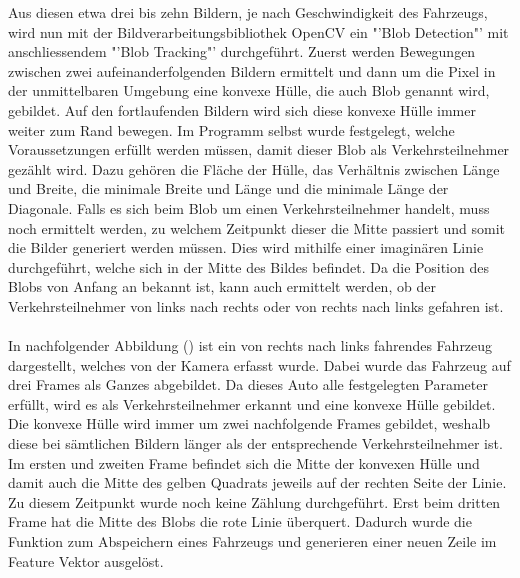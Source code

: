 Aus diesen etwa drei bis zehn Bildern, je nach Geschwindigkeit des Fahrzeugs, wird nun mit der Bildverarbeitungsbibliothek OpenCV ein "'Blob Detection"' mit anschliessendem "'Blob Tracking"' durchgeführt. Zuerst werden Bewegungen zwischen zwei aufeinanderfolgenden Bildern ermittelt und dann um die Pixel in der unmittelbaren Umgebung eine konvexe Hülle, die auch Blob genannt wird, gebildet. Auf den fortlaufenden Bildern wird sich diese konvexe Hülle immer weiter zum Rand bewegen. Im Programm selbst wurde festgelegt, welche Voraussetzungen erfüllt werden müssen, damit dieser Blob als Verkehrsteilnehmer gezählt wird. Dazu gehören die Fläche der Hülle, das Verhältnis zwischen Länge und Breite, die minimale Breite und Länge und die minimale Länge der Diagonale. Falls es sich beim Blob um einen Verkehrsteilnehmer handelt, muss noch ermittelt werden, zu welchem Zeitpunkt dieser die Mitte passiert und somit die Bilder generiert werden müssen. Dies wird mithilfe einer imaginären Linie durchgeführt, welche sich in der Mitte des Bildes befindet. Da die Position des Blobs von Anfang an bekannt ist, kann auch ermittelt werden, ob der Verkehrsteilnehmer von links nach rechts oder von rechts nach links gefahren ist.\\\\
In nachfolgender Abbildung () ist ein von rechts nach links fahrendes Fahrzeug dargestellt, welches von der Kamera erfasst wurde. Dabei wurde das Fahrzeug auf drei Frames als Ganzes abgebildet. Da dieses Auto alle festgelegten Parameter erfüllt, wird es als Verkehrsteilnehmer erkannt und eine konvexe Hülle gebildet. Die konvexe Hülle wird immer um zwei nachfolgende Frames gebildet, weshalb diese bei sämtlichen Bildern länger als der entsprechende Verkehrsteilnehmer ist. Im ersten und zweiten Frame befindet sich die Mitte der konvexen Hülle und damit auch die Mitte des gelben Quadrats jeweils auf der rechten Seite der Linie. Zu diesem Zeitpunkt wurde noch keine Zählung durchgeführt. Erst beim dritten Frame hat die Mitte des Blobs die rote Linie überquert. Dadurch wurde die Funktion zum Abspeichern eines Fahrzeugs und generieren einer neuen Zeile im Feature Vektor ausgelöst.

